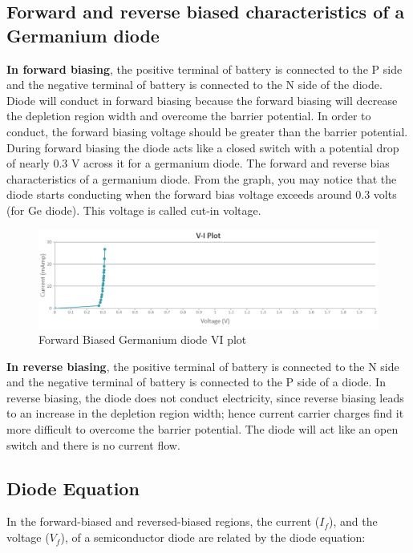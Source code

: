 		\subsection{Forward and reverse biased characteristics of a Germanium diode}
			\textbf{In forward biasing}, the positive terminal of battery is connected to the P side and the negative terminal of battery is connected to the N side of the diode. Diode will conduct in forward biasing because the forward biasing will decrease the depletion region width and overcome the barrier potential. In order to conduct, the forward biasing voltage should be greater than the barrier potential. During forward biasing the diode acts like a closed switch with a potential drop of nearly 0.3 V across it for a germanium diode. The forward and reverse bias characteristics of a germanium diode. From the graph, you may notice that the diode starts conducting when the forward bias voltage exceeds around 0.3 volts (for Ge diode). This voltage is called cut-in voltage.
			\begin{figure}[h]
				\centering
				\includegraphics[width=1\linewidth]{img/exp5/6}
				\caption{Forward Biased Germanium diode VI plot}
				\label{fig:pnjrvi}
			\end{figure}
		
			\textbf{In reverse biasing}, the positive terminal of battery is connected to the N side and the negative terminal of battery is connected to the P side of a diode. In reverse biasing, the diode does not conduct electricity, since reverse biasing leads to an increase in the depletion region width; hence current carrier charges find it more difficult to overcome the barrier potential. The diode will act like an open switch and there is no current flow.
			
		\subsection{Diode Equation}
			In the forward-biased and reversed-biased regions, the current (\(I_f\)), and the voltage (\(V_f\)), of a semiconductor diode are related by the diode equation:
			

